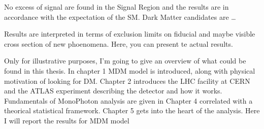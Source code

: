   No excess of signal are found in the Signal Region and the results are in accordance with the expectation of the SM. 
  Dark Matter candidates are \dots

  Results are interpreted in terms of exclusion limits on fiducial and maybe visible cross section of new phoenomena. Here, you can present te actual results.
  
  Only for illustrative purposes, I'm going to give an overview of what could be found in this thesis. In chapter 1 MDM model is introduced, along with physical motivation of looking for DM. Chapter 2 introduces the LHC facility at CERN and the ATLAS experiment describing the detector and how it works. Fundamentals of MonoPhoton analysis are given in Chapter 4 correlated with a theorical statistical framework. Chapter 5 gets into the heart of the analysis. Here I will report the results for MDM model %
